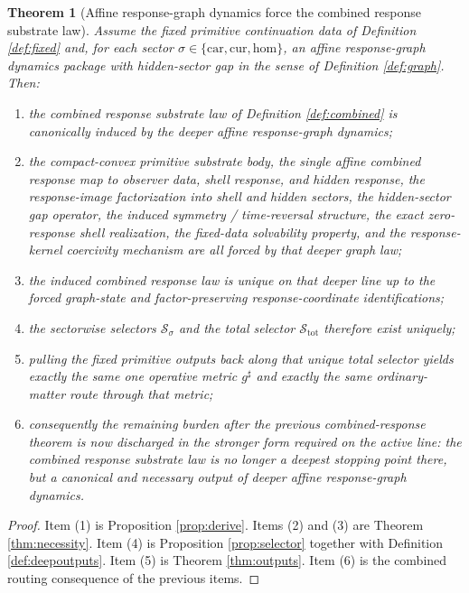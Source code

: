 \documentclass[11pt]{article}
\newcommand{\CompletedMetric}{g^{\sharp}}
\newcommand{\Car}{\mathrm{car}}
\newcommand{\Cur}{\mathrm{cur}}
\newcommand{\Hom}{\mathrm{hom}}
\newcommand{\ChainSelect}[1]{\mathcal S_{#1}}
\newcommand{\ChainSelectTriple}{\mathcal S_{\mathrm{tot}}}
\newtheorem{theorem}{Theorem}
\begin{document}
\begin{theorem}[Affine response-graph dynamics force the combined response substrate law]
\label{thm:main}
Assume the fixed primitive continuation data of Definition \ref{def:fixed} and, for each sector \(\sigma\in\{\Car,\Cur,\Hom\}\), an affine response-graph dynamics package with hidden-sector gap in the sense of Definition \ref{def:graph}. Then:
\begin{enumerate}
    \item the combined response substrate law of Definition \ref{def:combined} is canonically induced by the deeper affine response-graph dynamics;
    \item the compact-convex primitive substrate body, the single affine combined response map to observer data, shell response, and hidden response, the response-image factorization into shell and hidden sectors, the hidden-sector gap operator, the induced symmetry / time-reversal structure, the exact zero-response shell realization, the fixed-data solvability property, and the response-kernel coercivity mechanism are all forced by that deeper graph law;
    \item the induced combined response law is unique on that deeper line up to the forced graph-state and factor-preserving response-coordinate identifications;
    \item the sectorwise selectors \(\ChainSelect{\sigma}\) and the total selector \(\ChainSelectTriple\) therefore exist uniquely;
    \item pulling the fixed primitive outputs back along that unique total selector yields exactly the same one operative metric \(\CompletedMetric\) and exactly the same ordinary-matter route through that metric;
    \item consequently the remaining burden after the previous combined-response theorem is now discharged in the stronger form required on the active line: the combined response substrate law is no longer a deepest stopping point there, but a canonical and necessary output of deeper affine response-graph dynamics.
\end{enumerate}
\end{theorem}

\begin{proof}
Item (1) is Proposition \ref{prop:derive}. Items (2) and (3) are Theorem \ref{thm:necessity}. Item (4) is Proposition \ref{prop:selector} together with Definition \ref{def:deepoutputs}. Item (5) is Theorem \ref{thm:outputs}. Item (6) is the combined routing consequence of the previous items.
\end{proof}
\end{document}
